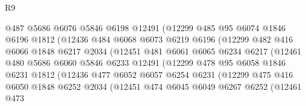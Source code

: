 \begin{lexlean}{R9}
\begin{coremodule}
                        @487
                        @5686
                        @6076
                        @5846
                        @6198
                        @12491
                        (@12299
                          @485
                          @95
                          @6074
                          @1846
                          @6196
                          @1812
                          (@12436
                            @484
                            @6068
                            @6073
                            @6219
                            @6196
                            (@12299
                              @482
                              @416
                              @6066
                              @1848
                              @6217
                              @2034
                              (@12451
                                @481
                                @6061
                                @6065
                                @6234
                                @6217
                                (@12461
                                  @480
                                  @5686
                                  @6060
                                  @5846
                                  @6233
                                  @12491
                                  (@12299
                                    @478
                                    @95
                                    @6058
                                    @1846
                                    @6231
                                    @1812
                                    (@12436
                                      @477
                                      @6052
                                      @6057
                                      @6254
                                      @6231
                                      (@12299
                                        @475
                                        @416
                                        @6050
                                        @1848
                                        @6252
                                        @2034
                                        (@12451
                                          @474
                                          @6045
                                          @6049
                                          @6267
                                          @6252
                                          (@12461
                                            @473

\end{coremodule}
\end{lexlean}

